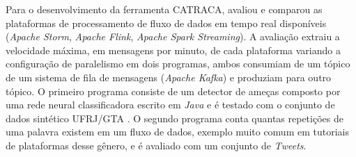 Para o desenvolvimento da ferramenta CATRACA,  avaliou e
comparou as plataformas de processamento de fluxo de dados em tempo real
disponíveis (\emph{Apache Storm}, \emph{Apache Flink}, \emph{Apache Spark Streaming}).
A avaliação extraiu a velocidade máxima, em mensagens por minuto,
de cada plataforma variando a configuração de paralelismo
em dois programas, ambos consumiam de um tópico de um sistema de fila
de mensagens (\emph{Apache Kafka}) e produziam para outro tópico.
O primeiro programa consiste de um detector de ameças composto por
uma rede neural classificadora escrito em \emph{Java} e é testado
com o conjunto de dados sintético UFRJ/GTA \cite{Lopez2018}.
O segundo programa conta quantas repetições de uma palavra existem em um
fluxo de dados, exemplo muito comum em tutoriais de plataformas desse gênero,
e é avaliado com um conjunto de \emph{Tweets}.

% 



